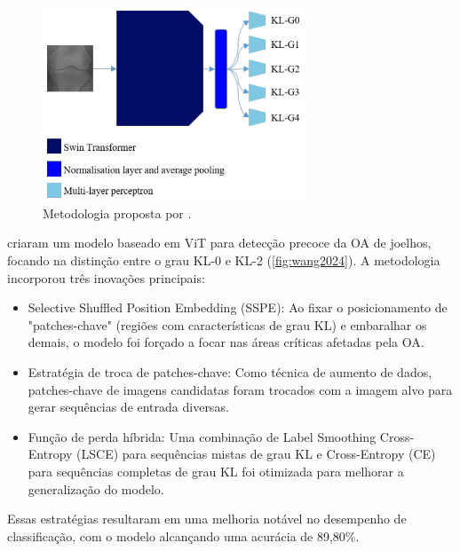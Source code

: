 \begin{figure}[ht]
    \centering
    \includegraphics[width=0.7\textwidth]{figs/sekhri2023.png}
    \caption{Metodologia proposta por .}
    \label{fig:sekhri2023}
\end{figure}

 criaram um modelo baseado em ViT para detecção precoce da OA de joelhos, focando na distinção entre o grau KL-0 e KL-2 (\autoref{fig:wang2024}). A metodologia incorporou três inovações principais:

\begin{itemize}
    \item Selective Shuffled Position Embedding (SSPE): Ao fixar o posicionamento de "patches-chave" (regiões com características de grau KL) e embaralhar os demais, o modelo foi forçado a focar nas áreas críticas afetadas pela OA.
    \item Estratégia de troca de patches-chave: Como técnica de aumento de dados, patches-chave de imagens candidatas foram trocados com a imagem alvo para gerar sequências de entrada diversas.
    \item Função de perda híbrida: Uma combinação de Label Smoothing Cross-Entropy (LSCE) para sequências mistas de grau KL e Cross-Entropy (CE) para sequências completas de grau KL foi otimizada para melhorar a generalização do modelo.
\end{itemize}

Essas estratégias resultaram em uma melhoria notável no desempenho de classificação, com o modelo alcançando uma acurácia de 89,80\%.

